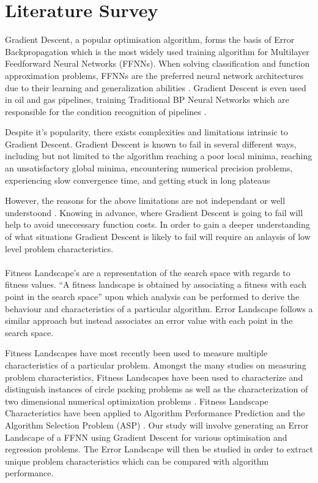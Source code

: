 \documentclass[runningheads,a4paper]{llncs}
\begin{document}
\section{Literature Survey}

Gradient Descent, a popular optimisation algorithm, forms the basis of Error Backpropagation which is 
the most widely used training algorithm for Multilayer Feedforward Neural Networks (FFNNs). 
When solving classification and function approximation problems, FFNNs are the preferred neural network architectures 
due to their learning and generalization abilities \cite{gong2012training}. Gradient Descent is even used in oil and gas pipelines, 
training Traditional BP Neural Networks which are responsible for the condition recognition of pipelines \cite{laibin2009novel}.

Despite it's popularity, there exists complexities and limitations intrinsic to Gradient Descent. Gradient Descent is known to fail in
several different ways, including but not limited to the algorithm reaching a poor local minima, reaching an unsatisfactory global minima,
encountering numerical precision problems, experiencing slow convergence time, and getting stuck in long plateaus \cite{baldi1995gradient,cetin1993global,laibin2009novel,soni2013performance}

However, the reasons for the above limitations are not independant or well understoond \cite{baldi1995gradient}. Knowing in advance, where Gradient 
Descent is going to fail will help to avoid uneccessary function costs. In order to gain a deeper understanding of what situations Gradient Descent is likely to fail
will require an anlaysis of low level problem characteristics.
\\\\
Fitness Landscape's are a representation of the search space with regards to
fitness values\cite{merkuryeva2010comparative}. ``A fitness landscape is obtained by associating a fitness with each point in the search space''\cite{uludag2009fitness} upon which analysis can be performed to derive
the behaviour and characteristics of a particular algorithm. Error Landscape follows a similar approach but instead associates an error value with each point in the search space.

Fitness Landscapes have most recently been used to measure multiple characteristics of a particular problem. Amongst the many studies on measuring problem characteristics, Fitness Landscapes have been used to characterize
and distinguish instances of circle packing problems \cite{morgan2014fitness} as well as the characterization of two dimensional numerical optimization problems \cite{munoz2012landscape}. Fitness Landscape Characteristics 
have been applied to Algorithm Performance Prediction \cite{smith2008towards,malan2014particle,mersmann2013novel} and the Algorithm Selection Problem (ASP) \cite{bischl2012algorithm}. Our study will involve generating an Error Landscape of
a FFNN using Gradient Descent for various optimisation and regression problems. The Error Landscape will then be studied in order to extract unique problem characteristics which can be compared with algorithm performance.
\end{document}
